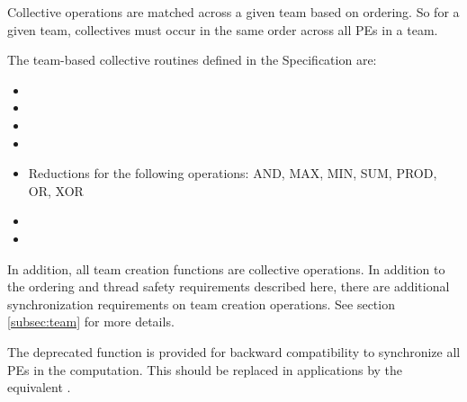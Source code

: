 {Collective operations are matched across a given team based on ordering. So for a given team,
collectives must occur in the same order across all PEs in a team.

The team-based collective routines defined in the \openshmem Specification are:

\begin{itemize}
\item {}
\item {}
\item {}
\item {}
\item Reductions for the following operations: AND, MAX, MIN, SUM, PROD, OR, XOR
\item {}
\item {}
\end{itemize}

In addition, all team creation functions are collective operations. In addition to the ordering
and thread safety requirements described here, there are additional synchronization requirements
on team creation operations. See section \ref{subsec:team} for more details.

The deprecated function  is provided for backward compatibility to synchronize
all \acp{PE} in the computation. This should be replaced in applications by the equivalent
.
}

